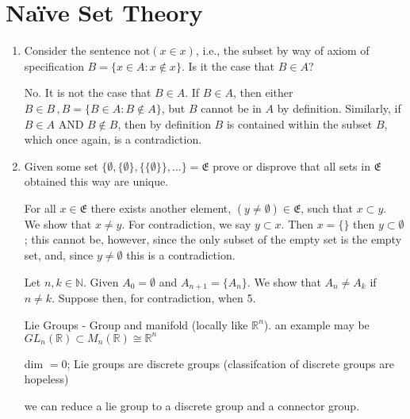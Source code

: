 \documentclass{report}
\begin{document}

\section{Na\"ive Set Theory}


\begin{enumerate}
  \item Consider the sentence \( \text{not}(x \in x) \), i.e., the subset by way of axiom of specification \( B=\{ x\in A : x \not \in x \} \). Is it the case that \( B\in A \)? 

    No. It is not the case that \( B\in A \). If \( B\in A \), then either \(B\in B \, , B=\{B\in A : B\not \in A\} \), but \( B \) cannot be in \( A \) by definition. Similarly, if \( B \in A \) AND \( B\not\in B \), then by definition \( B \) is contained within the subset \( B \), which once again, is a contradiction. 










  \item Given some set \( \{ \emptyset, \{ \emptyset \}, \{\{\emptyset\}\},\ldots  \} =\mathfrak{E}\) prove or disprove that all sets in \( \mathfrak{E} \) obtained this way are unique. 

    For all \( x\in \mathfrak{E} \) there exists another element, \(( y\neq \emptyset )\in \mathfrak{E}\), such that \(x \subset y  \). We show that \( x\neq y \). For contradiction, we say \( y \subset  x \). Then \( x=\{ \} \) then \( y\subset \emptyset \); this cannot be, however, since the only subset of the empty set is the empty set, and, since \( y\neq \emptyset \) this is a contradiction. 


    Let \( n,k \in \mathbb{N} \). Given \( A_{0} = \emptyset\) and \( A_{n+1}=\{A_{n}\}\). We show that \( A_n\neq A_k \) if \( n\neq k \). Suppose then, for contradiction, when 5.


Lie Groups - Group and manifold (locally like \( \mathbb{R}^n \)). an example may be \( GL_n(\mathbb{R})\subset M_n (\mathbb{R}) \cong \mathbb{R}^n \)

dim \( =0 \); Lie groups are discrete groups (classifcation of discrete groups are hopeless)

we can reduce a lie group to a discrete group and a connector group. 

\end{enumerate}
\end{document}
